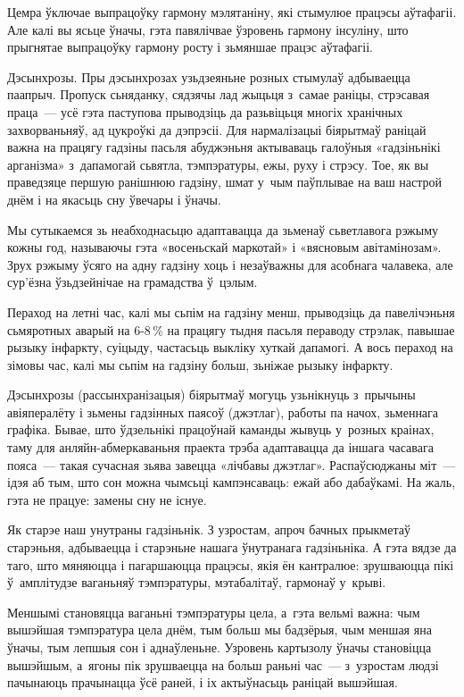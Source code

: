 Цемра ўключае выпрацоўку гармону мэлятаніну, які стымулюе працэсы аўтафагіі. Але калі вы ясьце ўначы, гэта павялічвае ўзровень гармону інсуліну, што прыгнятае выпрацоўку гармону росту і зьмяншае працэс аўтафагіі.

Дэсынхрозы. Пры дэсынхрозах узьдзеяньне розных стымулаў адбываецца паапрыч. Пропуск сьняданку, сядзячы лад жыцьця з~самае раніцы, стрэсавая праца~--- усё гэта паступова прыводзіць да разьвіцьця многіх хранічных захворваньняў, ад цукроўкі да дэпрэсіі. Для нармалізацыі біярытмаў раніцай важна на працягу гадзіны пасьля абуджэньня актываваць галоўныя «гадзіньнікі арганізма» з~дапамогай сьвятла, тэмпэратуры, ежы, руху і стрэсу. Тое, як вы праведзяце першую ранішнюю гадзіну, шмат у~чым паўплывае на ваш настрой днём і на якасьць сну ўвечары і ўначы.

Мы сутыкаемся зь неабходнасьцю адаптавацца да зьменаў сьветлавога рэжыму кожны год, называючы гэта «восеньскай маркотай» і «вясновым авітамінозам». Зрух рэжыму ўсяго на адну гадзіну хоць і незаўважны для асобнага чалавека, але сур'ёзна ўзьдзейнічае на грамадства ў~цэлым.

Пераход на летні час, калі мы сьпім на гадзіну менш, прыводзіць да павелічэньня сьмяротных аварый на 6-8\,\% на працягу тыдня пасьля пераводу стрэлак, павышае рызыку інфаркту, суіцыду, частасьць выкліку хуткай дапамогі. А вось пераход на зімовы час, калі мы сьпім на гадзіну больш, зьніжае рызыку інфаркту.

Дэсынхрозы (рассынхранізацыя) біярытмаў могуць узьнікнуць з~прычыны авіяпералёту і зьмены гадзінных паясоў (джэтлаг), работы па начох, зьменнага графіка. Бывае, што ўдзельнікі працоўнай каманды жывуць у~розных краінах, таму для анляйн-абмеркаваньня праекта трэба адаптавацца да іншага часавага пояса~--- такая сучасная зьява завецца «лічбавы джэтлаг». Распаўсюджаны міт~--- ідэя аб тым, што сон можна чымсьці кампэнсаваць: ежай або дабаўкамі. На жаль, гэта не працуе: замены сну не існуе.

Як старэе наш унутраны гадзіньнік. З узростам, апроч бачных прыкметаў старэньня, адбываецца і старэньне нашага ўнутранага гадзіньніка. А гэта вядзе да таго, што мяняюцца і пагаршаюцца працэсы, якія ён кантралюе: зрушваюцца пікі ў~амплітудзе ваганьняў тэмпэратуры, мэтабалітаў, гармонаў у~крыві.

Меншымі становяцца ваганьні тэмпэратуры цела, а~гэта вельмі важна: чым вышэйшая тэмпэратура цела днём, тым больш мы бадзёрыя, чым меншая яна ўначы, тым лепшыя сон і аднаўленьне. Узровень картызолу ўначы становіцца вышэйшым, а~ягоны пік зрушваецца на больш раньні час~--- з~узростам людзі пачынаюць прачынацца ўсё раней, і іх актыўнасьць раніцай вышэйшая.

